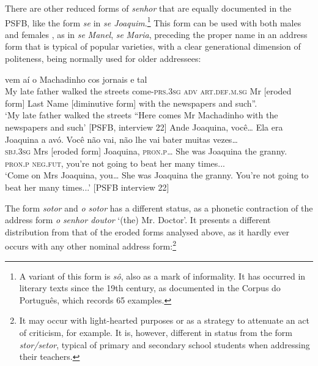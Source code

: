 \documentclass[output=paper]{langscibook}
\begin{document}
There are other reduced forms of \textit{senhor} that are equally documented in the PSFB, like the form \textit{se} in \textit{se Joaquim}.\footnote{A variant of this form is \textit{sô}, also as a mark of informality. It has occurred in literary texts since the 19th century, as documented in the Corpus do Português, which records 65 examples.} This form can be used with both males  and females , as in \textit{se} \textit{Manel}, \textit{se} \textit{Maria}, preceding the proper name in an address form that is typical of popular varieties, with a clear generational dimension of politeness, being normally used for older addressees:\largerpage[2]

\ea\label{ex:marques:32}
    vem      aí       o                                  Machadinho               {cos jornais} {e tal}\\
         {My late father walked the streets} come-\textsc{prs.3sg} \textsc{adv}    \textsc{art.def.m.sg}  {Mr [eroded form]} {Last Name [diminutive form]}    {with the newspapers} {and such}”.\\
\glt ‘My late father walked the streets “Here comes Mr Machadinho with the newspapers and such’ [PSFB, interview 22]
\ex\label{ex:marques:33}
\gll Ande                      Joaquina, você…    {Ela era Joaquina} a avó.     Você       {não vai},      {não lhe vai bater muitas vezes…}\\
         \textsc{sbj.3sg}   {Mrs [eroded form]}  Joaquina, \textsc{pron.p}…  {She was Joaquina}   the granny. \textsc{pron.p}   \textsc{neg.fut},    {you’re not going to beat her many times...}\\
\glt ‘Come on Mrs Joaquina, you… She was Joaquina the granny. You’re not going to beat her many times...’ [PSFB interview 22]
\z


The form \textit{sotor}  and \textit{o sotor}  has a different status, as a phonetic contraction of the address form \textit{o} \textit{senhor doutor} ‘(the) Mr. Doctor’. It presents a different distribution from that of the eroded forms analysed above, as it hardly ever occurs with any other nominal address form:\footnote{It may occur with light-hearted purposes or as a strategy to attenuate an act of criticism, for example. It is, however, different in status from the form \textit{stor/setor}, typical of primary and secondary school students when addressing their teachers.}
\end{document}
